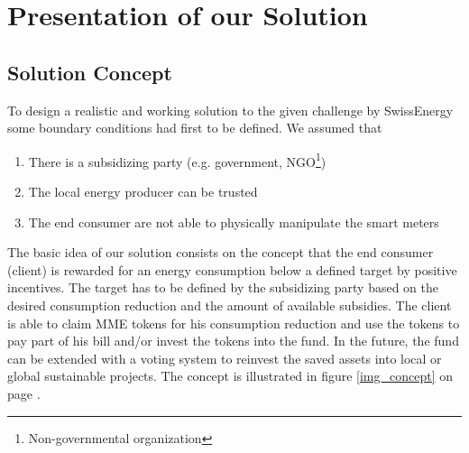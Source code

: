 \documentclass[11pt]{article}
\begin{document}
\section{Presentation of our Solution}

\subsection{Solution Concept}
To design a realistic and working solution to the given challenge by SwissEnergy some boundary conditions had first to be defined. We assumed that
\begin{enumerate}\itemsep0pt
	\item There is a subsidizing party (e.g. government, NGO\footnote{Non-governmental organization})
	\item The local energy producer can be trusted
	\item The end consumer are not able to physically manipulate the smart meters
\end{enumerate}
The basic idea of our solution consists on the concept that the end consumer (client) is rewarded for an energy consumption below a defined target by positive incentives. The target has to be defined by the subsidizing party based on the desired consumption reduction and the amount of available subsidies. The client is able to claim MME tokens for his consumption reduction and use the tokens to pay part of his bill and/or invest the tokens into the fund. In the future, the fund can be extended with a voting system to reinvest the saved assets into local or global sustainable projects. The concept is illustrated in figure \ref{img_concept} on page \pageref{img_concept}.
\end{document}
